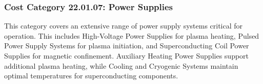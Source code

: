 
\subsubsection*{Cost Category 22.01.07: Power Supplies}

This category covers an extensive range of power supply systems critical for operation. This includes High-Voltage Power Supplies for plasma heating, Pulsed Power Supply Systems for plasma initiation, and Superconducting Coil Power Supplies for magnetic confinement. Auxiliary Heating Power Supplies support additional plasma heating, while Cooling and Cryogenic Systems maintain optimal temperatures for superconducting components.


